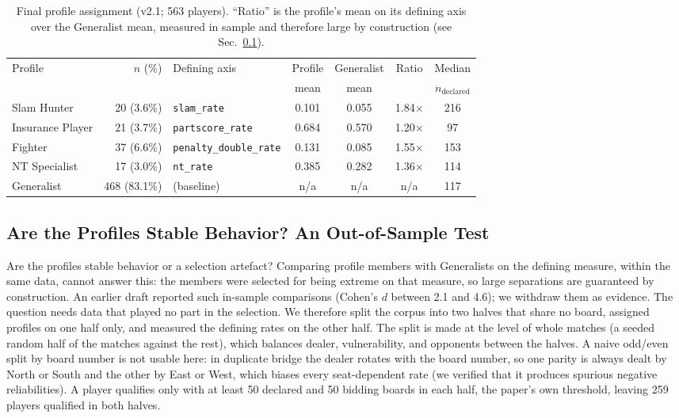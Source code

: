 \documentclass[11pt,a4paper]{article}
\begin{document}
\begin{table}[h]
\centering\small
\caption{Final profile assignment (v2.1; 563 players). ``Ratio'' is the
profile's mean on its defining axis over the Generalist mean, measured
in sample and therefore large by construction (see
Sec.~\ref{sec:validation}).}
\label{tab:profiles}
\begin{tabular}{lrlcccc}
\toprule
Profile & $n$ (\%) & Defining axis & Profile & Generalist & Ratio & Median\\
 & & & mean & mean & & $n_{\mathrm{declared}}$\\
\midrule
Slam Hunter      & 20 (3.6\%) & \texttt{slam\_rate}           & 0.101 & 0.055 & 1.84$\times$ & 216\\
Insurance Player & 21 (3.7\%) & \texttt{partscore\_rate}      & 0.684 & 0.570 & 1.20$\times$ & 97\\
Fighter          & 37 (6.6\%) & \texttt{penalty\_double\_rate}& 0.131 & 0.085 & 1.55$\times$ & 153\\
NT Specialist    & 17 (3.0\%) & \texttt{nt\_rate}             & 0.385 & 0.282 & 1.36$\times$ & 114\\
Generalist       & 468 (83.1\%) & (baseline) & n/a & n/a & n/a & 117\\
\bottomrule
\end{tabular}
\end{table}

\subsection{Are the Profiles Stable Behavior? An Out-of-Sample Test}\label{sec:validation}

Are the profiles stable behavior or a selection artefact? Comparing
profile members with Generalists on the defining measure, within the
same data, cannot answer this: the members were selected for being
extreme on that measure, so large separations are guaranteed by
construction. An earlier draft reported such in-sample comparisons
(Cohen's $d$ between 2.1 and 4.6); we withdraw them as evidence. The
question needs data that played no part in the selection. We therefore
split the corpus into two halves that share no board, assigned
profiles on one half only, and measured the defining rates on the
other half. The split is made at the level of whole matches (a seeded
random half of the matches against the rest), which balances dealer,
vulnerability, and opponents between the halves. A naive odd/even
split by board number is not usable here: in duplicate bridge the
dealer rotates with the board number, so one parity is always dealt by
North or South and the other by East or West, which biases every
seat-dependent rate (we verified that it produces spurious negative
reliabilities). A player qualifies only with at least 50 declared and
50 bidding boards in each half, the paper's own threshold, leaving 259
players qualified in both halves.
\end{document}
